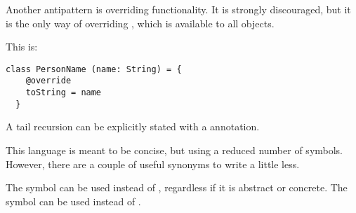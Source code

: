 Another antipattern is overriding functionality.
It is strongly discouraged, but it is the only way of overriding , which is available to all objects.

This is:
\begin{lstlisting}[label={lst:exampleToString}]
  class PersonName (name: String) = {
    @override
    toString = name
  }
\end{lstlisting}

A tail recursion can be explicitly stated with a \stailrec annotation.

This language is meant to be concise, but using a reduced number of symbols.
However, there are a couple of useful synonyms to write a little less.

The symbol \sasterisk can be used instead of \sclass, regardless if it is abstract or concrete.
The symbol \splus can be used instead of \simport.

